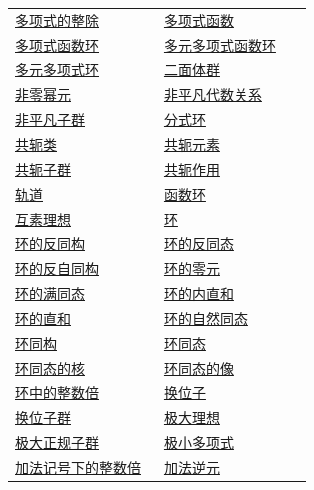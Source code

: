 \begin{longtable}{@{}>{\raggedright\arraybackslash}p{0.47\linewidth}>{\raggedright\arraybackslash}p{0.47\linewidth}@{}}
\hyperref[p2:concept:c3-divisibility]{多项式的整除} & \hyperref[p2:concept:c3-polynomial-functions]{多项式函数}\\
\hyperref[p2:concept:c3-polynomial-functions]{多项式函数环} & \hyperref[p2:concept:c3-multivariate-functions]{多元多项式函数环}\\
\hyperref[p2:concept:c3-multivariate-ring]{多元多项式环} & \hyperref[p2:concept:c1-l164]{二面体群}\\
\hyperref[p2:concept:c3-nilpotent]{非零幂元} & \hyperref[p2:concept:c3-finitely-generated-ring]{非平凡代数关系}\\
\hyperref[p2:concept:c1-l253]{非平凡子群} & \hyperref[p2:concept:c3-fraction-ring]{分式环}\\
\hyperref[p2:concept:c2-l1151]{共轭类} & \hyperref[p2:concept:c2-l978]{共轭元素}\\
\hyperref[p2:concept:c2-l978]{共轭子群} & \hyperref[p2:concept:c2-l971]{共轭作用}\\
\hyperref[p2:concept:c2-l1031]{轨道} & \hyperref[p2:concept:c3-multivariate-functions]{函数环}\\
\hyperref[p2:concept:c3-ideal-product]{互素理想} & \hyperref[p2:concept:c1-l781]{环}\\
\hyperref[p2:concept:c3-antiisomorphism]{环的反同构} & \hyperref[p2:concept:c3-antiisomorphism]{环的反同态}\\
\hyperref[p2:concept:c3-antiisomorphism]{环的反自同构} & \hyperref[p2:concept:c1-l785]{环的零元}\\
\hyperref[p2:concept:c1-l1157]{环的满同态} & \hyperref[p2:concept:c3-ring-internal-sum]{环的内直和}\\
\hyperref[p2:concept:c3-ring-sum]{环的直和} & \hyperref[p2:concept:c1-l1328]{环的自然同态}\\
\hyperref[p2:concept:c1-l923]{环同构} & \hyperref[p2:concept:c1-l1152]{环同态}\\
\hyperref[p2:concept:c1-l1156]{环同态的核} & \hyperref[p2:concept:c1-l1156]{环同态的像}\\
\hyperref[p2:concept:c1-l830]{环中的整数倍} & \hyperref[p2:concept:c2-l173]{换位子}\\
\hyperref[p2:concept:c2-l173]{换位子群} & \hyperref[p2:concept:c3-prime-maximal]{极大理想}\\
\hyperref[p2:concept:c2-l617]{极大正规子群} & \hyperref[p2:concept:c3-minimal-polynomial]{极小多项式}\\
\hyperref[p2:concept:c1-l106]{加法记号下的整数倍} & \hyperref[p2:concept:c1-l785]{加法逆元}\\

\end{longtable}
